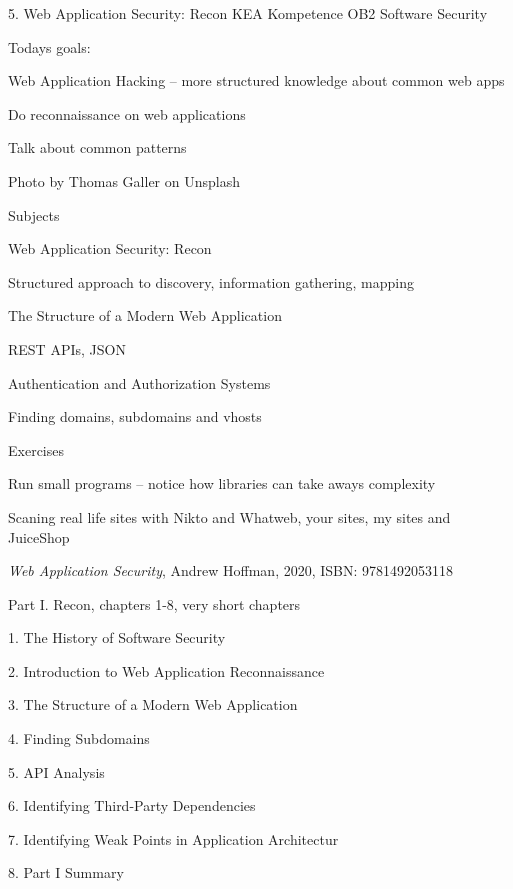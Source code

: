 \documentclass[Screen16to9,17pt]{foils}
\begin{document}
\mytitlepage
{5. Web Application Security: Recon}
{KEA Kompetence OB2 Software Security}



Todays goals:
\begin{list2}
\item Web Application Hacking -- more structured knowledge about common web apps
\item Do reconnaissance on web applications
\item Talk about common patterns
\end{list2}

Photo by Thomas Galler on Unsplash




\begin{list1}
\item Subjects
\item Web Application Security: Recon
\begin{list2}
\item Structured approach to discovery, information gathering, mapping
\item The Structure of a Modern Web Application
\item REST APIs, JSON
\item Authentication and Authorization Systems
\item Finding domains, subdomains and vhosts
\end{list2}
\item Exercises
\begin{list2}
\item Run small programs -- notice how libraries can take aways complexity
\item Scaning real life sites with Nikto and Whatweb, your sites, my sites and JuiceShop
\end{list2}
\end{list1}



\emph{Web Application Security}, Andrew Hoffman, 2020, ISBN: 9781492053118
\begin{list1}
\item Part I. Recon, chapters 1-8, very short chapters
\item 1. The History of Software Security
\item 2. Introduction to Web Application Reconnaissance
\item 3. The Structure of a Modern Web Application
\item 4. Finding Subdomains
\item 5. API Analysis
\item 6. Identifying Third-Party Dependencies
\item 7. Identifying Weak Points in Application Architectur
\item 8. Part I Summary
\end{list1}
\end{document}
